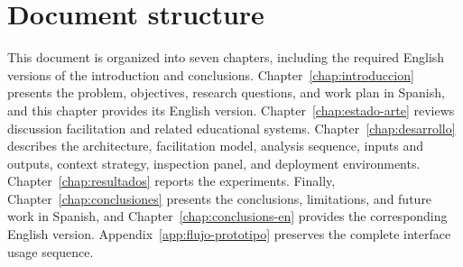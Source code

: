 \section{Document structure}

This document is organized into seven chapters, including the required English versions of the introduction and conclusions. Chapter~\ref{chap:introduccion} presents the problem, objectives, research questions, and work plan in Spanish, and this chapter provides its English version. Chapter~\ref{chap:estado-arte} reviews discussion facilitation and related educational systems. Chapter~\ref{chap:desarrollo} describes the architecture, facilitation model, analysis sequence, inputs and outputs, context strategy, inspection panel, and deployment environments. Chapter~\ref{chap:resultados} reports the experiments. Finally, Chapter~\ref{chap:conclusiones} presents the conclusions, limitations, and future work in Spanish, and Chapter~\ref{chap:conclusions-en} provides the corresponding English version. Appendix~\ref{app:flujo-prototipo} preserves the complete interface usage sequence.

